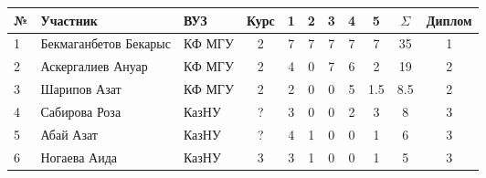 \begin{center}
\begin{tabular}{|l|l|l|c|c|c|c|c|c|c|c|}
\hline
№ & Участник & ВУЗ & Курс & 1 & 2 & 3 & 4 & 5  & $\Sigma$ & Диплом \\
\hline
1 & Бекмаганбетов Бекарыс & КФ МГУ & 2 & 7 & 7 & 7 & 7 & 7 & 35 & 1 \\
\hline
2 & Аскергалиев Ануар & КФ МГУ & 2 & 4 & 0 & 7 & 6 & 2 & 19 & 2 \\
\hline
3 & Шарипов Азат & КФ МГУ & 2 & 2 & 0 & 0 & 5 & 1.5 & 8.5 & 2 \\
\hline
4 & Сабирова Роза & КазНУ & ? & 3 & 0 & 0 & 2 & 3 & 8 & 3 \\
\hline
5 & Абай Азат & КазНУ & ? & 4 & 1 & 0 & 0 & 1 & 6 & 3 \\
\hline
6 & Ногаева Аида & КазНУ & 3 & 3 & 1 & 0 & 0 & 1 & 5 & 3 \\
\hline
\end{tabular}
\end{center}
